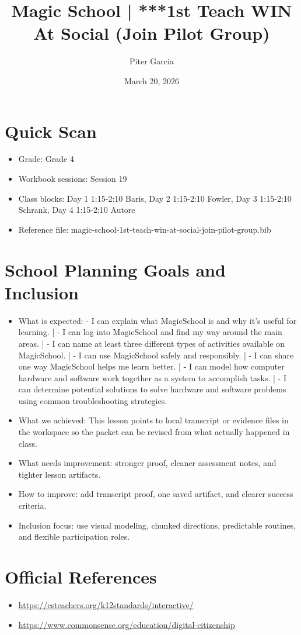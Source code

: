 \documentclass[11pt]{article}
\title{Magic School | ***1st Teach WIN At Social (Join Pilot Group)}
\author{Piter Garcia}
\date{March 20, 2026}
\begin{document}
    \maketitle
    \section*{Quick Scan}
    \begin{itemize}[leftmargin=*]
    \item Grade: Grade 4
    \item Workbook sessions: Session 19
    \item Class blocks: Day 1 1:15-2:10 Baris, Day 2 1:15-2:10 Fowler, Day 3 1:15-2:10 Schrank, Day 4 1:15-2:10 Autore
    \item Reference file: magic-school-1st-teach-win-at-social-join-pilot-group.bib
    \end{itemize}
    \section*{School Planning Goals and Inclusion}
    \begin{itemize}[leftmargin=*]
    \item What is expected: - I can explain what MagicSchool is and why it's useful for learning. | - I can log into MagicSchool and find my way around the main areas. | - I can name at least three different types of activities available on MagicSchool. | - I can use MagicSchool safely and responsibly. | - I can share one way MagicSchool helps me learn better. | - I can model how computer hardware and software work together as a system to accomplish tasks. | - I can determine potential solutions to solve hardware and software problems using common troubleshooting strategies.
    \item What we achieved: This lesson points to local transcript or evidence files in the workspace so the packet can be revised from what actually happened in class.
    \item What needs improvement: stronger proof, cleaner assessment notes, and tighter lesson artifacts.
    \item How to improve: add transcript proof, one saved artifact, and clearer success criteria.
    \item Inclusion focus: use visual modeling, chunked directions, predictable routines, and flexible participation roles.
    \end{itemize}
    \section*{Official References}
    \begin{itemize}[leftmargin=*]
    \item \url{https://csteachers.org/k12standards/interactive/}
\item \url{https://www.commonsense.org/education/digital-citizenship}

    \end{itemize}
    
\end{document}

